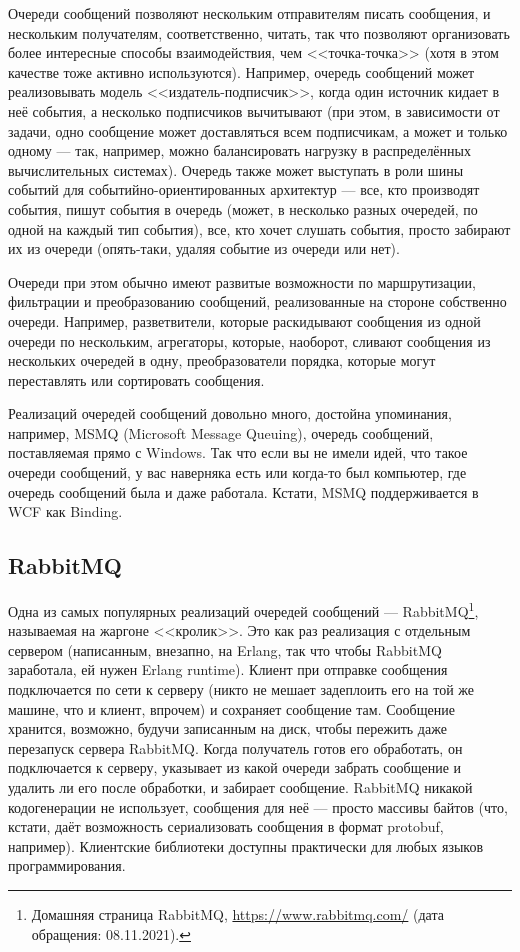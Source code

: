 \documentclass{../../text-style}
\begin{document}
Очереди сообщений позволяют нескольким отправителям писать сообщения, и нескольким получателям, соответственно, читать, так что позволяют организовать более интересные способы взаимодействия, чем <<точка-точка>> (хотя в этом качестве тоже активно используются). Например, очередь сообщений может реализовывать модель <<издатель-подписчик>>, когда один источник кидает в неё события, а несколько подписчиков вычитывают (при этом, в зависимости от задачи, одно сообщение может доставляться всем подписчикам, а может и только одному --- так, например, можно балансировать нагрузку в распределённых вычислительных системах). Очередь также может выступать в роли шины событий для событийно-ориентированных архитектур --- все, кто производят события, пишут события в очередь (может, в несколько разных очередей, по одной на каждый тип события), все, кто хочет слушать события, просто забирают их из очереди (опять-таки, удаляя событие из очереди или нет).

Очереди при этом обычно имеют развитые возможности по маршрутизации, фильтрации и преобразованию сообщений, реализованные на стороне собственно очереди. Например, разветвители, которые раскидывают сообщения из одной очереди по нескольким, агрегаторы, которые, наоборот, сливают сообщения из нескольких очередей в одну, преобразователи порядка, которые могут переставлять или сортировать сообщения.

Реализаций очередей сообщений довольно много, достойна упоминания, например, MSMQ (Microsoft Message Queuing), очередь сообщений, поставляемая прямо с Windows. Так что если вы не имели идей, что такое очереди сообщений, у вас наверняка есть или когда-то был компьютер, где очередь сообщений была и даже работала. Кстати, MSMQ поддерживается в WCF как Binding.

\subsection{RabbitMQ}

Одна из самых популярных реализаций очередей сообщений --- RabbitMQ\footnote{Домашняя страница RabbitMQ, \url{https://www.rabbitmq.com/} (дата обращения: 08.11.2021).}, называемая на жаргоне <<кролик>>. Это как раз реализация с отдельным сервером (написанным, внезапно, на Erlang, так что чтобы RabbitMQ заработала, ей нужен Erlang runtime). Клиент при отправке сообщения подключается по сети к серверу (никто не мешает задеплоить его на той же машине, что и клиент, впрочем) и сохраняет сообщение там. Сообщение хранится, возможно, будучи записанным на диск, чтобы пережить даже перезапуск сервера RabbitMQ. Когда получатель готов его обработать, он подключается к серверу, указывает из какой очереди забрать сообщение и удалить ли его после обработки, и забирает сообщение. RabbitMQ никакой кодогенерации не использует, сообщения для неё --- просто массивы байтов (что, кстати, даёт возможность сериализовать сообщения в формат protobuf, например). Клиентские библиотеки доступны практически для любых языков программирования.
\end{document}
